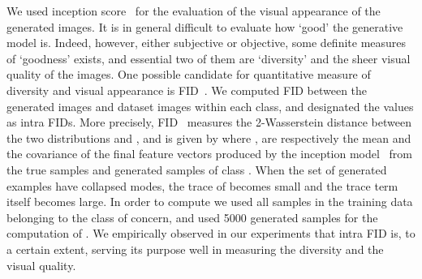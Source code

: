 \documentclass{article}
\begin{document}
We used inception score~\cite[]{salimans2016improved} for the evaluation of the visual appearance of the generated images.
It is in general difficult to evaluate how `good' the generative model is.
Indeed, however, either subjective or objective, some definite measures of `goodness' exists, and essential two of them are  `diversity' and the sheer visual quality of the images.  
One possible candidate for quantitative measure of diversity and visual appearance is FID~\cite[]{heusel2017gans}.  
We computed FID between the generated images and dataset images within each class, and designated the values as intra FIDs.
More precisely, FID~\cite[]{heusel2017gans} measures the 2-Wasserstein distance between the two distributions  and , and is given by 
where ,  are respectively the mean and the covariance of the final feature vectors produced by the inception model~\cite[]{szegedy2015going} from the true samples and generated samples of class .
When the set of generated examples have collapsed modes, the trace of  becomes small and the trace term itself becomes large. 
In order to compute  we used all samples in the training data belonging to the class of concern, and used 5000 generated samples for the computation of .
We empirically observed in our experiments that intra FID is, to a certain extent, serving its purpose well in measuring the diversity and the visual quality.
\end{document}
